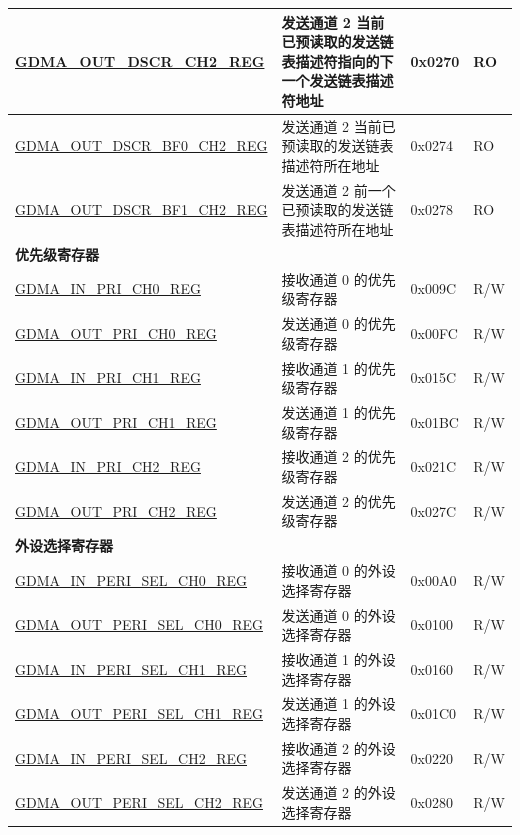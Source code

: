 \begin{longtable}{ | p{6cm} | p{7.2cm} | p{1.3cm} | p{1cm} | }
\hyperref[regdesc:GDMAOUTDSCRCHNREG]{GDMA\_OUT\_DSCR\_CH2\_REG} & 发送通道 2 当前已预读取的发送链表描述符指向的下一个发送链表描述符地址 & 0x0270 & RO \\ \hline
\hyperref[regdesc:GDMAOUTDSCRBF0CHNREG]{GDMA\_OUT\_DSCR\_BF0\_CH2\_REG} &  发送通道 2 当前已预读取的发送链表描述符所在地址 & 0x0274 & RO \\ \hline
\hyperref[regdesc:GDMAOUTDSCRBF1CHNREG]{GDMA\_OUT\_DSCR\_BF1\_CH2\_REG} & 发送通道 2 前一个已预读取的发送链表描述符所在地址 & 0x0278 & RO \\ \hline
\multicolumn{4}{|l|}{\textbf{优先级寄存器}} \\ \hline
\hyperref[regdesc:GDMAINPRICHNREG]{GDMA\_IN\_PRI\_CH0\_REG} & 接收通道 0 的优先级寄存器 & 0x009C & R/W \\ \hline
\hyperref[regdesc:GDMAOUTPRICHNREG]{GDMA\_OUT\_PRI\_CH0\_REG} & 发送通道 0 的优先级寄存器 & 0x00FC & R/W \\ \hline
\hyperref[regdesc:GDMAINPRICHNREG]{GDMA\_IN\_PRI\_CH1\_REG} & 接收通道 1 的优先级寄存器 & 0x015C & R/W \\ \hline
\hyperref[regdesc:GDMAOUTPRICHNREG]{GDMA\_OUT\_PRI\_CH1\_REG} & 发送通道 1 的优先级寄存器 & 0x01BC & R/W \\ \hline
\hyperref[regdesc:GDMAINPRICHNREG]{GDMA\_IN\_PRI\_CH2\_REG} & 接收通道 2 的优先级寄存器 & 0x021C & R/W \\ \hline
\hyperref[regdesc:GDMAOUTPRICHNREG]{GDMA\_OUT\_PRI\_CH2\_REG} & 发送通道 2 的优先级寄存器 & 0x027C & R/W \\ \hline
\multicolumn{4}{|l|}{\textbf{外设选择寄存器}} \\ \hline
\hyperref[regdesc:GDMAINPERISELCHNREG]{GDMA\_IN\_PERI\_SEL\_CH0\_REG} & 接收通道 0 的外设选择寄存器 & 0x00A0 & R/W \\ \hline
\hyperref[regdesc:GDMAOUTPERISELCHNREG]{GDMA\_OUT\_PERI\_SEL\_CH0\_REG} & 发送通道 0 的外设选择寄存器 & 0x0100 & R/W \\ \hline
\hyperref[regdesc:GDMAINPERISELCHNREG]{GDMA\_IN\_PERI\_SEL\_CH1\_REG} & 接收通道 1 的外设选择寄存器 & 0x0160 & R/W \\ \hline
\hyperref[regdesc:GDMAOUTPERISELCHNREG]{GDMA\_OUT\_PERI\_SEL\_CH1\_REG} & 发送通道 1 的外设选择寄存器 & 0x01C0 & R/W \\ \hline
\hyperref[regdesc:GDMAINPERISELCHNREG]{GDMA\_IN\_PERI\_SEL\_CH2\_REG} & 接收通道 2 的外设选择寄存器 & 0x0220 & R/W \\ \hline
\hyperref[regdesc:GDMAOUTPERISELCHNREG]{GDMA\_OUT\_PERI\_SEL\_CH2\_REG} & 发送通道 2 的外设选择寄存器 & 0x0280 & R/W \\ \hline
\end{longtable}
